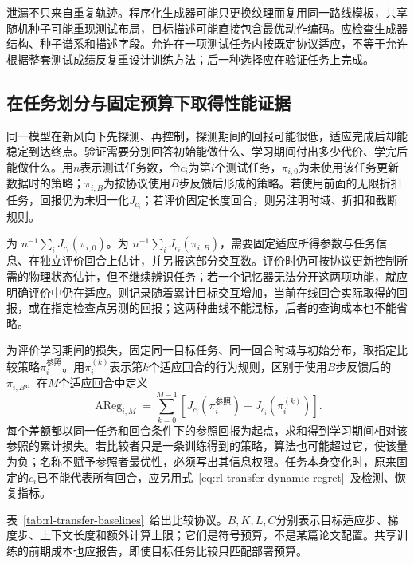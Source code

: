 泄漏不只来自重复轨迹。程序化生成器可能只更换纹理而复用同一路线模板，共享随机种子可能重现测试布局，目标描述可能直接包含最优动作编码。应检查生成器结构、种子谱系和描述字段。允许在一项测试任务内按既定协议适应，不等于允许根据整套测试成绩反复重设计训练方法；后一种选择应在验证任务上完成。

\subsection{在任务划分与固定预算下取得性能证据}
\label{sec:rl-transfer-evidence}

同一模型在新风向下先探测、再控制，探测期间的回报可能很低，适应完成后却能稳定到达终点。验证需要分别回答初始能做什么、学习期间付出多少代价、学完后能做什么。用$n$表示测试任务数，令$c_i$为第$i$个测试任务，$\pi_{i,0}$为未使用该任务更新数据时的策略；$\pi_{i,B}$为按协议使用$B$步反馈后形成的策略。若使用前面的无限折扣任务，回报仍为未归一化$J_{c_i}$；若评价固定长度回合，则另注明时域、折扣和截断规则。

为
$n^{-1}\sum_iJ_{c_i}(\pi_{i,0})$。为
$n^{-1}\sum_iJ_{c_i}(\pi_{i,B})$，需要固定适应所得参数与任务信息、在独立评价回合上估计，并另报这部分交互数。评价时仍可按协议更新控制所需的物理状态估计，但不继续辨识任务；若一个记忆器无法分开这两项功能，就应明确评价中仍在适应。则记录随着累计目标交互增加，当前在线回合实际取得的回报，或在指定检查点另测的回报；这两种曲线不能混标，后者的查询成本也不能省略。

为评价学习期间的损失，固定同一目标任务、同一回合时域与初始分布，取指定比较策略$\pi_i^{\text{参照}}$。用$\pi_i^{(k)}$表示第$k$个适应回合的行为规则，区别于使用$B$步反馈后的$\pi_{i,B}$。在$M$个适应回合中定义
\begin{equation}
 \operatorname{AReg}_{i,M}
 =\sum_{k=0}^{M-1}
 \left[J_{c_i}(\pi_i^{\text{参照}})
       -J_{c_i}(\pi_i^{(k)})\right].
 \label{eq:rl-transfer-adaptation-regret}
\end{equation}
每个差额都以同一任务和回合条件下的参照回报为起点，求和得到学习期间相对该参照的累计损失。若比较者只是一条训练得到的策略，算法也可能超过它，使该量为负；名称不赋予参照者最优性，必须写出其信息权限。任务本身变化时，原来固定的$c_i$已不能代表所有回合，应另用式~\eqref{eq:rl-transfer-dynamic-regret}~及检测、恢复指标。

表~\ref{tab:rl-transfer-baselines}~给出比较协议。$B,K,L,C$分别表示目标适应步、梯度步、上下文长度和额外计算上限；它们是符号预算，不是某篇论文配置。共享训练的前期成本也应报告，即使目标任务比较只匹配部署预算。

